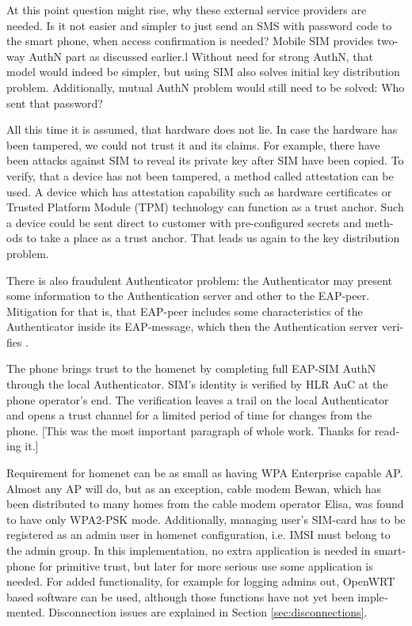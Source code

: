 \documentclass[12pt,a4paper,english]{tutthesis}
\begin{document}
\begin{otherlanguage}{english}
At this point question might rise, why these external service
providers are needed. Is it not easier and simpler to just send 
an SMS with password code to the smart phone, when access confirmation is needed?
Mobile SIM provides two-way AuthN part as discussed earlier.l
Without need for strong AuthN, that model would indeed be 
simpler, but using SIM also solves initial key distribution problem.
Additionally, mutual AuthN problem would still need to be solved:
Who sent that password?



All this time it is assumed, that hardware does not lie. In case
the hardware has been tampered, we could not trust it and its claims.
For example, there have been attacks against SIM to reveal its private
key after SIM have been copied.  To verify, that a device has not been
tampered, a method called attestation can be used.
A device which has attestation capability such as 
hardware certificates or Trusted Platform Module (TPM) technology
can function as a trust anchor.
Such a device could be sent direct to customer with pre-configured
secrets and methods to take a place as a trust anchor. 
That leads us again to the key distribution problem.

There is also fraudulent Authenticator problem: the Authenticator may present some 
information to the Authentication server and other to the EAP-peer.
Mitigation for that is, that EAP-peer includes some 
characteristics of the Authenticator inside its EAP-message, which
then the Authentication server verifies \cite[rfc6677]{rfc6677}.



The phone brings trust to the homenet by completing full EAP-SIM AuthN through
the local Authenticator. SIM's identity is verified by HLR AuC at the phone
operator's end. The verification leaves a trail on the local Authenticator and
opens a trust channel for a limited period of time for changes from the phone.
[This was the most important paragraph of whole work. Thanks for
reading it.]





Requirement for homenet can be as small as having WPA Enterprise capable
AP. Almost any AP will do, but as an exception, cable modem Bewan, which 
has been distributed to many homes from the cable modem operator Elisa, was found to have only WPA2-PSK mode.
Additionally, managing user's SIM-card has to be registered as an admin user in homenet 
configuration, i.e. IMSI must belong to the admin group.
In this implementation, no extra application is needed in smartphone
for primitive trust, but later for more serious use some application is needed.
For added functionality, for example for logging admins out, OpenWRT
based software can be used, although those functions have not yet been
implemented. Disconnection issues are explained in Section
\ref{sec:disconnections}.


\end{otherlanguage}
\end{document}
